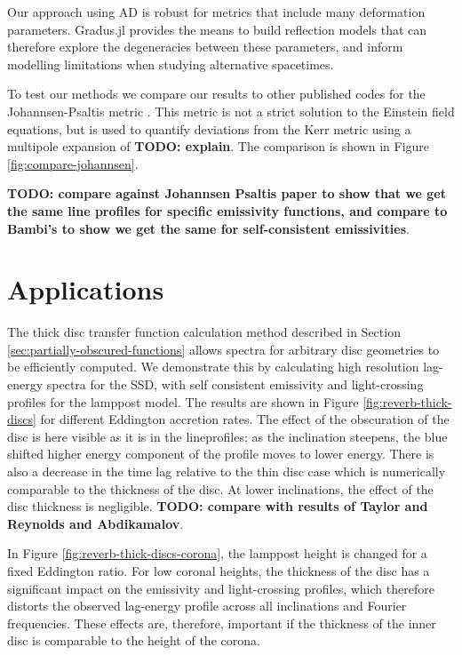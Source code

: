 \documentclass[fleqn,usenatbib]{mnras}
\newcommand{\todo}[1]{{\noindent \bf \color{red} TODO: #1}}
\newcommand{\Gradus}{Gradus.jl\xspace}
\begin{document}
Our approach using AD is robust for metrics that include many deformation
parameters. \Gradus provides the means to build reflection models that can
therefore explore the degeneracies between these parameters, and inform
modelling limitations when studying alternative spacetimes.

To test our methods we compare our results to other published codes for the
Johannsen-Psaltis metric \citep{johannsen_regular_2013}. This metric is not a
strict solution to the Einstein field equations, but is used to quantify
deviations from the Kerr metric using a multipole expansion of \todo{explain}.
The comparison is shown in Figure \ref{fig:compare-johannsen}.

\todo{compare against Johannsen Psaltis paper to show that we get the same line profiles for specific emissivity functions, and compare to Bambi's to show we get the same for self-consistent emissivities}.

\section{Applications}
\label{sec:applications}

The thick disc transfer function calculation method described in Section
\ref{sec:partially-obscured-functions} allows spectra for arbitrary disc
geometries to be efficiently computed. We demonstrate this by calculating high
resolution lag-energy spectra for the SSD, with self consistent emissivity and
light-crossing profiles for the lamppost model. The results are shown in Figure
\ref{fig:reverb-thick-discs} for different Eddington accretion rates. The effect
of the obscuration of the disc is here visible as it is in the lineprofiles; as
the inclination steepens, the blue shifted higher energy component of the
profile moves to lower energy. There is also a decrease in the time lag relative
to the thin disc case which is numerically comparable to the thickness of the
disc. At lower inclinations, the effect of the disc thickness is negligible.
\todo{compare with results of Taylor and Reynolds and Abdikamalov}.

In Figure \ref{fig:reverb-thick-discs-corona}, the lamppost height is changed
for a fixed Eddington ratio. For low coronal heights, the thickness of the disc
has a significant impact on the emissivity and light-crossing profiles, which
therefore distorts the observed lag-energy profile across all inclinations and
Fourier frequencies. These effects are, therefore, important if the thickness of the inner disc is comparable to the height of the corona.
\end{document}
